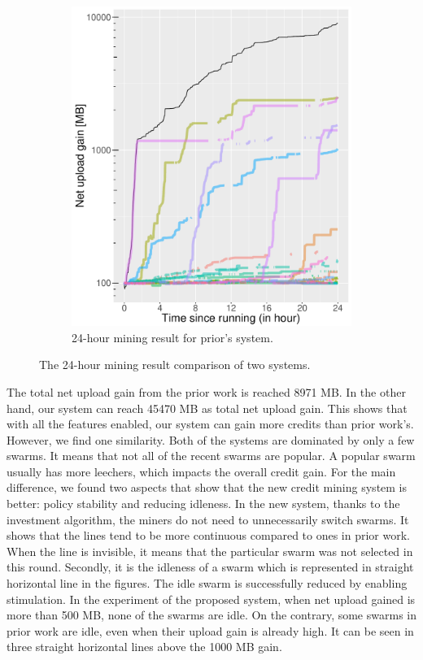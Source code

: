 \begin{figure}[h]
\begin{adjustwidth}{-1.5cm}{}
\begin{subfigure}[t]{0.6\textwidth}
			\includegraphics[width=\textwidth]{pics/results/m138.pdf}
			\caption{24-hour mining result for prior's system.}
			\label{fig:oldetree24}
		\end{subfigure}
		\caption{The 24-hour mining result comparison of two systems.}
	\end{adjustwidth}
\end{figure}

The total net upload gain from the prior work is reached 8971 MB. In the other hand, our system can reach 45470 MB as total net upload gain. This shows that with all the features enabled, our system can gain more credits than prior work's. However, we find one similarity. Both of the systems are dominated by only a few swarms. It means that not all of the recent swarms are popular. A popular swarm usually has more leechers, which impacts the overall credit gain. For the main difference, we found two aspects that show that the new credit mining system is better: policy stability and reducing idleness. In the new system, thanks to the investment algorithm, the miners do not need to unnecessarily switch swarms. It shows that the lines tend to be more continuous compared to ones in prior work. When the line is invisible, it means that the particular swarm was not selected in this round. Secondly, it is the idleness of a swarm which is represented in straight horizontal line in the figures. The idle swarm is successfully reduced by enabling stimulation. In the experiment of the proposed system, when net upload gained is more than 500 MB, none of the swarms are idle. On the contrary, some swarms in prior work are idle, even when their upload gain is already high. It can be seen in three straight horizontal lines above the 1000 MB gain.


